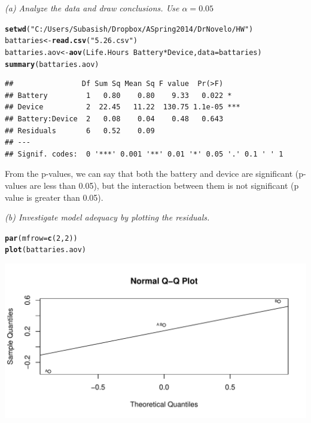 \documentclass[a4paper]{article}\usepackage{graphicx, color}
\makeatletter
\def\maxwidth{ %
  \ifdim\Gin@nat@width>\linewidth
    \linewidth
  \else
    \Gin@nat@width
  \fi
}
\newcommand{\hlfunctioncall}[1]{\textcolor[rgb]{0.501960784313725,0,0.329411764705882}{\textbf{#1}}}%
\newcommand{\hlstring}[1]{\textcolor[rgb]{0.6,0.6,1}{#1}}%
\newenvironment{kframe}{%
 \def\at@end@of@kframe{}%
 \ifinner\ifhmode%
  \def\at@end@of@kframe{\end{minipage}}%
  \begin{minipage}{\columnwidth}%
 \fi\fi%
 \def\FrameCommand##1{\hskip\@totalleftmargin \hskip-\fboxsep
 \colorbox{shadecolor}{##1}\hskip-\fboxsep
     \hskip-\linewidth \hskip-\@totalleftmargin \hskip\columnwidth}%
 \MakeFramed {\advance\hsize-\width
   \@totalleftmargin\z@ \linewidth\hsize
   \@setminipage}}%
 {\par\unskip\endMakeFramed%
 \at@end@of@kframe}
\newenvironment{knitrout}{}{} %
\makeatother
\begin{document}
\textit{(a) Analyze the data and draw conclusions. Use  $\alpha = 0.05$} \\
\begin{knitrout}
\color{fgcolor}\begin{kframe}
\begin{alltt}
\hlfunctioncall{setwd}(\hlstring{"C:/Users/Subasish/Dropbox/A Spring 2014/Dr Novelo/HW"})
battaries <- \hlfunctioncall{read.csv}(\hlstring{"5.26.csv"})
battaries.aov <- \hlfunctioncall{aov}(Life.Hours ~ Battery * Device, data = battaries)
\hlfunctioncall{summary}(battaries.aov)
\end{alltt}
\begin{verbatim}
##                Df Sum Sq Mean Sq F value  Pr(>F)    
## Battery         1   0.80    0.80    9.33   0.022 *  
## Device          2  22.45   11.22  130.75 1.1e-05 ***
## Battery:Device  2   0.08    0.04    0.48   0.643    
## Residuals       6   0.52    0.09                    
## ---
## Signif. codes:  0 '***' 0.001 '**' 0.01 '*' 0.05 '.' 0.1 ' ' 1
\end{verbatim}
\end{kframe}
\end{knitrout}


From the p-values, we can say that both the battery and device are significant (p-values are less than 0.05), but the interaction between them is not significant (p value is greater than 0.05).\\

\vspace{2 mm}

\textit{(b) Investigate model adequacy by plotting the residuals.}\\
\begin{knitrout}
\color{fgcolor}\begin{kframe}
\begin{alltt}
\hlfunctioncall{par}(mfrow = \hlfunctioncall{c}(2, 2))
\hlfunctioncall{plot}(battaries.aov)
\end{alltt}
\end{kframe}
\includegraphics[width=\maxwidth]{figure/unnamed-chunk-16} 

\end{knitrout}
\end{document}
